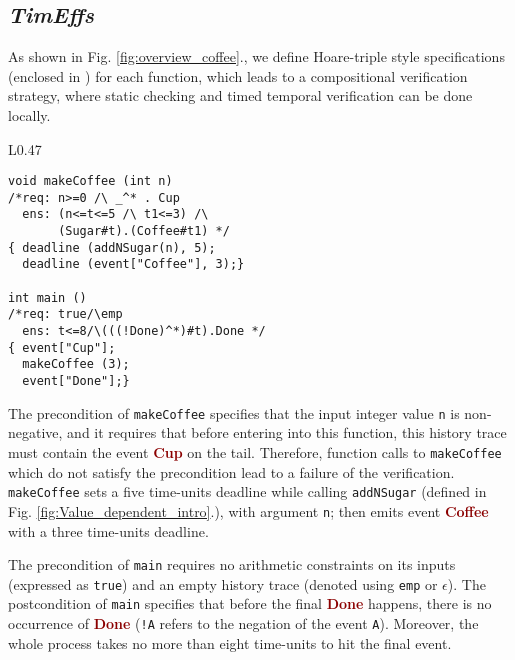 \documentclass[acmsmall,10pt,review]{acmart}
\newcommand{\codem}[1]{{\lstinline[basicstyle=\small\ttfamily]|#1|}}
\newcommand{\timedEffects}{\emph{TimEffs}}
\newcommand{\anyevent}[1]{{\textcolor{darkred}
{{\textbf{\small #1}}}}}
\newcommand{\code}[1]{{\tt{\ensuremath{\m{#1}}}}}
\newcommand{\m}{\mathit}
\newcommand\figref[1]{Fig. \textcolor{black}{\ref{#1}}.}
\begin{document}
\subsection{\timedEffects}
As shown in \figref{fig:overview_coffee}, we define Hoare-triple 
style specifications (enclosed in 
\textcolor{darklavender}{}) for each function, 
which leads to a compositional verification strategy, where static 
checking and timed temporal verification can be done locally. 



\begin{wrapfigure}{L}{0.47\columnwidth}
\begin{lstlisting}[name=coffee]
void makeCoffee (int n)
/*req: n>=0 /\ _^* . Cup
  ens: (n<=t<=5 /\ t1<=3) /\
       (Sugar#t).(Coffee#t1) */
{ deadline (addNSugar(n), 5);
  deadline (event["Coffee"], 3);}  

int main ()
/*req: true/\emp
  ens: t<=8/\(((!Done)^*)#t).Done */ 
{ event["Cup"];
  makeCoffee (3);
  event["Done"];}
\end{lstlisting}  
\caption{To make coffee with three portions of sugar 
within eight time units.}\label{fig:overview_coffee}
\end{wrapfigure}



The precondition of \codem{makeCoffee} 
 specifies that the input integer value \codem{n} is non-negative, and it requires that before entering into this 
function, this history trace must contain the event  
\anyevent{Cup} on the tail. Therefore, function calls to \codem{makeCoffee} which 
do not satisfy the precondition lead to a failure of the verification. 
\codem{makeCoffee} sets a 
five time-units deadline while calling 
\codem{addNSugar} (defined in \figref{fig:Value_dependent_intro}),
 with argument \codem{n}; then emits event \anyevent{Coffee} with
 a three time-units deadline. 


The precondition of \codem{main} requires no arithmetic constraints 
on its inputs (expressed as \codem{true}) and 
an empty history trace (denoted using \codem{emp} or \code{\epsilon}).
The postcondition of \codem{main} specifies 
that before the final \anyevent{Done} happens, there is no 
occurrence of \anyevent{Done} (\codem{!A} refers to the 
negation of the event \codem{A}). Moreover, the whole process takes 
no more than eight time-units to hit the final event. 
\end{document}
